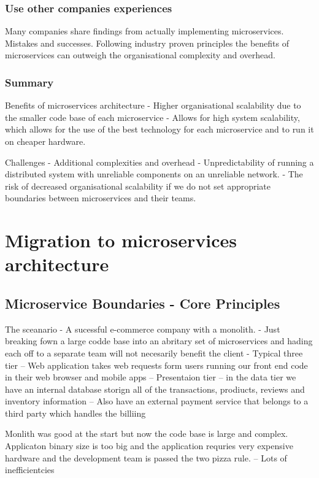 \documentclass[a4paper, 11pt]{book}
\begin{document}
{    \subsubsection{Use other companies experiences}
    Many companies share findings from actually implementing microservices. Mistakes and successes.
    Following industry proven principles the benefits of microservices can outweigh the organisational complexity and overhead.

    \subsubsection{Summary}
    Benefits of microservices architecture
    - Higher organisational scalability due to the smaller code base of each microservice
    - Allows for high system scalability, which allows for the use of the best technology for each microservice and to run it on cheaper hardware.

    Challenges
    - Additional complexities and overhead
    - Unpredictability of running a distributed system with unreliable components on an unreliable network.
    - The risk of decreased organisational scalability if we do not set appropriate boundaries between microservices and their teams.


    \section{Migration to microservices architecture}

    \subsection{Microservice Boundaries - Core Principles}
    The sceanario - A sucessful e-commerce company with a monolith.
    - Just breaking fown a large codde base into an abritary set of microservices and hading each off to a separate team will not necesarily benefit the client
    - Typical three tier
    -- Web application takes web requests form users running our front end code in their web browser and mobile apps -- Presentaion tier
    -- in the data tier we have an internal database storign all of the transactions, prodiucts, reviews and inventory information
    -- Also have an external payment service that belongs to a third party which handles the billiing

    Monlith was good at the start but now the code base is large and complex.
    Applicaton binary size is too big and the application requries very expensive hardware and the development team is passed the two pizza rule.
    -- Lots of inefficientcies

}
\end{document}

